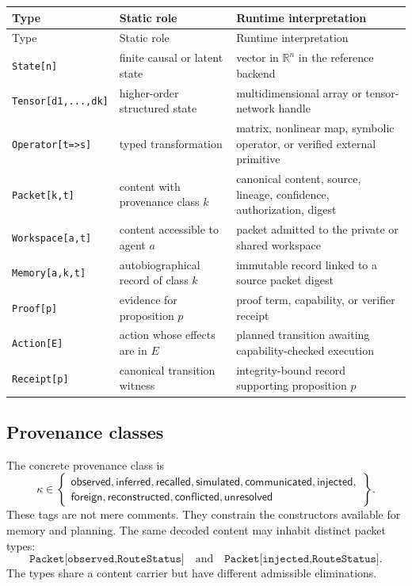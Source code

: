 \begin{longtable}{p{}p{}p{}}
\toprule
Type & Static role & Runtime interpretation \\
\midrule
\endfirsthead
\toprule
Type & Static role & Runtime interpretation \\
\midrule
\endhead
\texttt{State[n]} & finite causal or latent state & vector in \(\mathbb R^n\) in the reference backend \\
\texttt{Tensor[d1,...,dk]} & higher-order structured state & multidimensional array or tensor-network handle \\
\texttt{Operator[t=>s]} & typed transformation & matrix, nonlinear map, symbolic operator, or verified external primitive \\
\texttt{Packet[k,t]} & content with provenance class \(k\) & canonical content, source, lineage, confidence, authorization, digest \\
\texttt{Workspace[a,t]} & content accessible to agent \(a\) & packet admitted to the private or shared workspace \\
\texttt{Memory[a,k,t]} & autobiographical record of class \(k\) & immutable record linked to a source packet digest \\
\texttt{Proof[p]} & evidence for proposition \(p\) & proof term, capability, or verifier receipt \\
\texttt{Action[E]} & action whose effects are in \(E\) & planned transition awaiting capability-checked execution \\
\texttt{Receipt[p]} & canonical transition witness & integrity-bound record supporting proposition \(p\) \\
\bottomrule
\end{longtable}

\subsection{Provenance classes}

The concrete provenance class is
\[
\kappa\in
\left\{
\begin{array}{l}
\mathsf{observed},\mathsf{inferred},\mathsf{recalled},
\mathsf{simulated},\mathsf{communicated},\mathsf{injected},\\
\mathsf{foreign},\mathsf{reconstructed},\mathsf{conflicted},
\mathsf{unresolved}
\end{array}
\right\}.
\]
These tags are not mere comments.  They constrain the constructors available
for memory and planning.  The same decoded content may inhabit distinct packet
types:
\[
\texttt{Packet[observed,RouteStatus]}
\quad\text{and}\quad
\texttt{Packet[injected,RouteStatus]}.
\]
The types share a content carrier but have different admissible eliminations.


